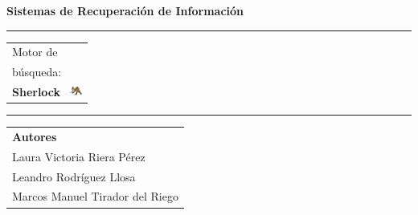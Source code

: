 \documentclass{llncs}
\begin{document}
	\thispagestyle{empty}
	\begin{flushleft}
		\LARGE\bfseries Sistemas de Recuperaci\'on de Informaci\'on\\[2cm]
	\end{flushleft}
	\rule{\textwidth}{1pt}
	\vspace{2pt}
	\begin{flushright}
		\Huge
		\begin{tabular}{@{}l}
			Motor de \\
			b\'usqueda:\\
			\textbf{Sherlock}
			\includegraphics[height=1em]{sherlock.png}\\[6pt]
		\end{tabular}
	\end{flushright}
	\rule{\textwidth}{1pt}
	\vfill
	\begin{flushleft}
		\large\itshape
		\begin{tabular}{@{}l}
			{\large\upshape\bfseries Autores}\\[8pt]
			Laura Victoria Riera P\'erez\\[5pt]
			Leandro Rodr\'iguez Llosa\\[5pt]
			Marcos Manuel Tirador del Riego
		\end{tabular}
	\end{flushleft}
	
\end{document}
